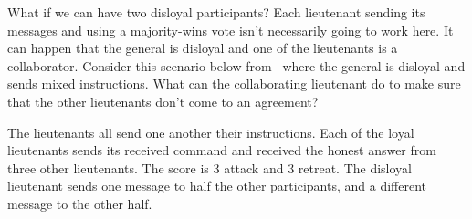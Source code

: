 What if we can have two disloyal participants? Each lieutenant sending its messages and using a majority-wins vote isn't necessarily going to work here. It can happen that the general is disloyal and one of the lieutenants is a collaborator. Consider this scenario below from~\cite{mte241} where the general is disloyal and sends mixed instructions. What can the collaborating lieutenant do to make sure that the other lieutenants don't come to an agreement?

\begin{center}
\end{center}

The lieutenants all send one another their instructions. Each of the loyal lieutenants sends its received command and received the honest answer from three other lieutenants. The score is 3 attack and 3 retreat. The disloyal lieutenant sends one message to half the other participants, and a different message to the other half.

